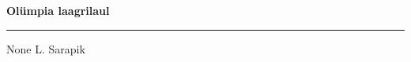 \documentclass[10pt]{book}
\begin{document}
{
  \samepage
  \raggedbottom
  \raggedright
  \sloppy


  \vspace{0.2in}

  \noindent\begin{minipage}{.1\textwidth}
    \hfill\vspace{0.1in}
  \end{minipage}%
  \noindent\begin{minipage}{.8\textwidth}
    \centering
    \bfseries
    \large Ol\"umpia laagrilaul
  \end{minipage}%
  \noindent\begin{minipage}{.1\textwidth}
      \hfill\vspace{0.1in}
  \end{minipage}

  \nopagebreak[4]
  \vspace{0.1in}
  \nopagebreak[4]
  \hrule height 0.05ex
  \nopagebreak[4]
  \vspace{-0.05in}

  {\footnotesize None \hfill L. Sarapik }\\
  \vspace{0.01in}



}
\end{document}
